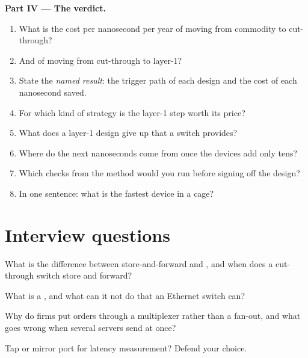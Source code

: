 \begin{problem}
\medskip\noindent\textbf{Part IV --- The verdict.}
\begin{enumerate}[resume]
\item What is the cost per nanosecond per year of moving from commodity to cut-through?
\item And of moving from cut-through to layer-1?
\item State the \emph{named result}: the trigger path of each design and the cost of each nanosecond saved.
\item For which kind of strategy is the layer-1 step worth its price?
\item What does a layer-1 design give up that a switch provides?
\item Where do the next nanoseconds come from once the devices add only tens?
\item Which checks from the method would you run before signing off the design?
\item In one sentence: what is the fastest device in a cage?
\end{enumerate}
\end{problem}

\section{Interview questions}

\begin{interviewq}\label{iq:nw:switches-and-layer-1-devices:1}
What is the difference between store-and-forward and , and when does a cut-through switch store and forward?
\end{interviewq}

\begin{interviewq}\label{iq:nw:switches-and-layer-1-devices:2}
What is a , and what can it not do that an Ethernet switch can?
\end{interviewq}

\begin{interviewq}\label{iq:nw:switches-and-layer-1-devices:3}
Why do firms put orders through a multiplexer rather than a fan-out, and what goes wrong when several servers send at once?
\end{interviewq}

\begin{interviewq}\label{iq:nw:switches-and-layer-1-devices:4}
Tap or mirror port for latency measurement? Defend your choice.
\end{interviewq}

